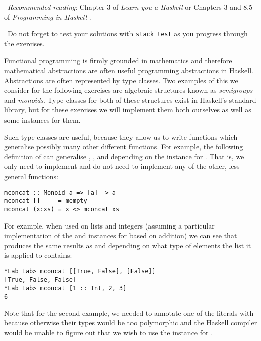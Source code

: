 \makebox[0.5cm]{\faBook}~\emph{Recommended reading}: Chapter 3 of \emph{Learn you a Haskell} \citep{lipovaca2011learn} or Chapters 3 and 8.5 of \emph{Programming in Haskell} \citep{hutton2016programming}.

\makebox[0.5cm]{\faLightbulbO}~Do not forget to test your solutions with \texttt{\small stack test} as you progress through the exercises.

\taskLine 

Functional programming is firmly grounded in mathematics and therefore mathematical abstractions are often useful programming abstractions in Haskell. Abstractions are often represented by type classes. Two examples of this we consider for the following exercises are algebraic structures known as \emph{semigroups} and \emph{monoids}. Type classes for both of these structures exist in Haskell's standard library, but for these exercises we will implement them both ourselves as well as some instances for them.

Such type classes are useful, because they allow us to write functions which generalise possibly many other different functions. For example, the following definition of  can generalise , , and  depending on the  instance for . That is, we only need to implement  and do not need to implement any of the other, less general functions:

\begin{verbatim}
mconcat :: Monoid a => [a] -> a
mconcat []     = mempty
mconcat (x:xs) = x <> mconcat xs
\end{verbatim}
For example, when used on lists and integers (assuming a particular implementation of the  and  instances for  based on addition) we can see that  produces the same results as  and  depending on what type of elements the list it is applied to contains:
\begin{verbatim}
*Lab Lab> mconcat [[True, False], [False]] 
[True, False, False]
*Lab Lab> mconcat [1 :: Int, 2, 3]
6
\end{verbatim}
Note that for the second example, we needed to annotate one of the literals with  because otherwise their types would be too polymorphic and the Haskell compiler would be unable to figure out that we wish to use the  instance for .

